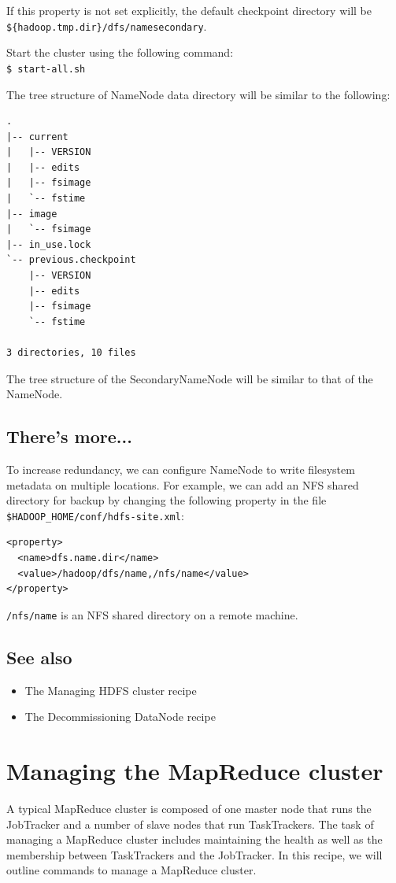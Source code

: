 If this property is not set explicitly, the default checkpoint directory will be \verb|${hadoop.tmp.dir}/dfs/namesecondary|.

Start the cluster using the following command: \\
\verb|$ start-all.sh|

The tree structure of NameNode data directory will be similar to the following:
\lstset{style=bashstyle}
\begin{lstlisting}
.
|-- current
|   |-- VERSION
|   |-- edits
|   |-- fsimage
|   `-- fstime
|-- image
|   `-- fsimage
|-- in_use.lock
`-- previous.checkpoint
    |-- VERSION
    |-- edits
    |-- fsimage
    `-- fstime

3 directories, 10 files
\end{lstlisting}

The tree structure of the SecondaryNameNode will be similar to that of the NameNode.

\subsection*{There's more...}
To increase redundancy, we can configure NameNode to write filesystem metadata on multiple locations. For example, we can add an NFS shared directory for backup by changing the following property in the file \verb|$HADOOP_HOME/conf/hdfs-site.xml|:
\begin{verbatim}
<property>
  <name>dfs.name.dir</name>
  <value>/hadoop/dfs/name,/nfs/name</value>
</property>
\end{verbatim}

\verb|/nfs/name| is an NFS shared directory on a remote machine.
\subsection*{See also}
\begin{itemize}
\item The Managing HDFS cluster recipe
\item The Decommissioning DataNode recipe
\end{itemize}
\section{Managing the MapReduce cluster}
A typical MapReduce cluster is composed of one master node that runs the JobTracker and a number of slave nodes that run TaskTrackers. The task of managing a MapReduce cluster includes maintaining the health as well as the membership between TaskTrackers and the JobTracker. In this recipe, we will outline commands to manage a MapReduce cluster.
